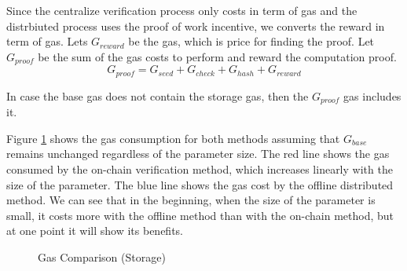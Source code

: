 \documentclass[runningheads]{llncs}
\begin{document}
Since the centralize verification process only costs in term of gas and the distrbiuted process uses the proof of work incentive, we converts the reward in term of gas. Lets $G_{reward}$ be the gas, which is price for finding the proof. Let \( G_{proof} \) be the sum of the gas costs to perform and reward the  computation proof. 
\[
G_{proof} = G_{seed} + G_{check} + G_{hash} + G_{reward} 
\]

In case the base gas does not contain the storage gas, then the \( G_{proof} \) gas includes it.

Figure \ref{fig:gas_compare} shows the gas consumption for both methods assuming that $G_{base}$ remains unchanged regardless of the parameter size. The red line shows the gas consumed by the on-chain verification method, which increases linearly with the size of the parameter. The blue line shows the gas cost by the offline distributed method. We can see that in the beginning, when the size of the parameter is small, it costs more with the offline method than with the on-chain method, but at one point it will show its benefits.

\begin{figure}
  \centering
  \caption{Gas Comparison (Storage)}
  \label{fig:gas_compare}
\end{figure}
\end{document}
